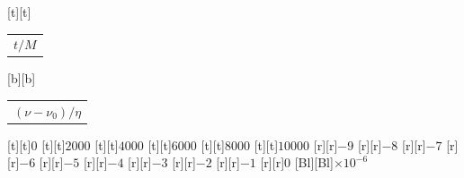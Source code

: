 %    
%
%
\begin{psfrags}%
\psfragscanon%
%
[t][t]{\color[rgb]{0,0,0}\setlength{\tabcolsep}{0pt}\begin{tabular}{c}{\Large$t/M$}\end{tabular}}%
[b][b]{\color[rgb]{0,0,0}\setlength{\tabcolsep}{0pt}\begin{tabular}{c}{\Large$(\nu - \nu_0)/\eta$}\end{tabular}}%
%
[t][t]{$0$}%
[t][t]{$2000$}%
[t][t]{$4000$}%
[t][t]{$6000$}%
[t][t]{$8000$}%
[t][t]{$10000$}%
%
[r][r]{$-9$}%
[r][r]{$-8$}%
[r][r]{$-7$}%
[r][r]{$-6$}%
[r][r]{$-5$}%
[r][r]{$-4$}%
[r][r]{$-3$}%
[r][r]{$-2$}%
[r][r]{$-1$}%
[r][r]{$0$}%
[Bl][Bl]{$\times 10^{-6}$}%
%
%
\end{psfrags}%
%
